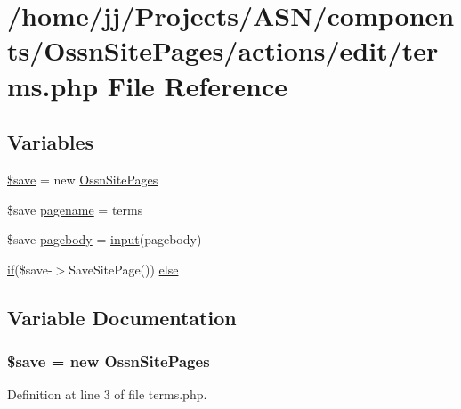 \hypertarget{actions_2edit_2terms_8php}{}\section{/home/jj/\+Projects/\+A\+S\+N/components/\+Ossn\+Site\+Pages/actions/edit/terms.php File Reference}
\label{actions_2edit_2terms_8php}
\subsection*{Variables}
\begin{DoxyCompactItemize}
\item 
\hyperlink{actions_2edit_2terms_8php_a00e6dff44e00c36820da5508c6d9aba3}{\$save} = new \hyperlink{class_ossn_site_pages}{Ossn\+Site\+Pages}
\item 
\$save \hyperlink{actions_2edit_2terms_8php_a80628cda62ee6fb56006a1a49ea33304}{pagename} = \textquotesingle{}terms\textquotesingle{}
\item 
\$save \hyperlink{actions_2edit_2terms_8php_ac5e77655d4436fc87c23b803e772f55b}{pagebody} = \hyperlink{ossn_8lib_8input_8php_a64ebee98b041c4f75f71ed3cd73cc8ed}{input}(\textquotesingle{}pagebody\textquotesingle{})
\item 
\hyperlink{jquery_8tokeninput_8js_ad8dd46a3cbc004569e34401e9e71771a}{if}(\$save-\/$>$Save\+Site\+Page()) \hyperlink{actions_2edit_2terms_8php_a3652d10f06e3bfc8edd1455fd0c357ae}{else}
\end{DoxyCompactItemize}


\subsection{Variable Documentation}
\subsubsection[{\texorpdfstring{\$save}{$save}}]{\setlength{\rightskip}{0pt plus 5cm}\$save = new {\bf Ossn\+Site\+Pages}}\hypertarget{actions_2edit_2terms_8php_a00e6dff44e00c36820da5508c6d9aba3}{}\label{actions_2edit_2terms_8php_a00e6dff44e00c36820da5508c6d9aba3}


Definition at line 3 of file terms.\+php.

